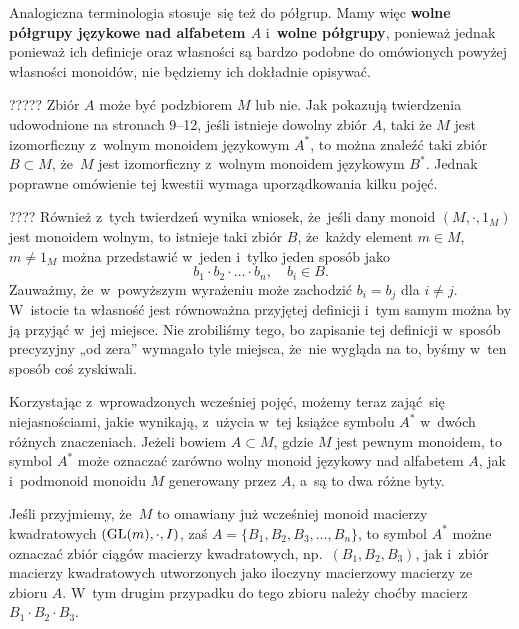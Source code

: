 \documentclass[a4paper,11pt]{article}
\begin{document}
Analogiczna terminologia stosuje~się też do półgrup. Mamy więc \textbf{wolne
  półgrupy językowe nad alfabetem $A$} i~\textbf{wolne półgrupy}, ponieważ
jednak ponieważ ich definicje oraz własności są bardzo podobne do
omówionych powyżej własności monoidów, nie będziemy ich dokładnie opisywać.

????? Zbiór $A$ może być podzbiorem
$M$ lub nie. Jak pokazują twierdzenia udowodnione na stronach 9--12,
jeśli istnieje dowolny zbiór $A$, taki że $M$ jest izomorficzny
z~wolnym monoidem językowym $A^{ * }$, to można znaleźć taki zbiór
$B \subset M$, że~$M$ jest izomorficzny z~wolnym monoidem językowym
$B^{ * }$. Jednak poprawne omówienie tej kwestii wymaga uporządkowania
kilku pojęć.

???? Również z~tych twierdzeń wynika wniosek, że~jeśli dany monoid
$( M, \cdot, 1_{ M } )$ jest monoidem wolnym, to istnieje taki zbiór
$B$, że~każdy element $m \in M$, $m \neq 1_{ M }$ można przedstawić
w~jeden i~tylko jeden sposób jako
\begin{equation}
  \label{eq:Forys-Forys-04}
  b_{ 1 } \cdot b_{ 2 } \cdot \ldots \cdot b_{ n }, \quad
  b_{ i } \in B.
\end{equation}
Zauważmy, że~w~powyższym wyrażeniu może zachodzić $b_{ i } = b_{ j }$
dla $i \neq j$. W~istocie ta własność jest równoważna przyjętej
definicji i~tym samym można by ją przyjąć w~jej miejsce. Nie
zrobiliśmy tego, bo zapisanie tej definicji w~sposób precyzyjny „od
zera” wymagało tyle miejsca, że~nie wygląda na to, byśmy w~ten sposób
coś zyskiwali.

\vspace{\spaceFour}





\start {} Korzystając z~wprowadzonych wcześniej pojęć, możemy
teraz zająć~się niejasnościami, jakie wynikają, z~użycia w~tej książce
symbolu $A^{ * }$ w~dwóch różnych znaczeniach. Jeżeli bowiem
$A \subset M$, gdzie $M$ jest pewnym monoidem, to symbol $A^{ * }$
może oznaczać zarówno wolny monoid językowy nad alfabetem $A$, jak
i~podmonoid monoidu $M$ generowany przez $A$, a~są to dwa różne
byty.

Jeśli przyjmiemy, że~$M$ to omawiany już wcześniej monoid macierzy
kwadratowych $( \mathrm{GL}( m ), \cdot, I )$, zaś
$A = \{ B_{ 1 }, B_{ 2 }, B_{ 3 }, \ldots, B_{ n } \}$, to symbol
$A^{ * }$ możne oznaczać zbiór ciągów macierzy kwadratowych,
np.~$( B_{ 1 }, B_{ 2 }, B_{ 3 } )$, jak i~zbiór macierzy kwadratowych
utworzonych jako iloczyny macierzowy macierzy ze zbioru $A$. W~tym
drugim przypadku do tego zbioru należy choćby macierz
$B_{ 1 } \cdot B_{ 2 } \cdot B_{ 3 }$.
\end{document}
